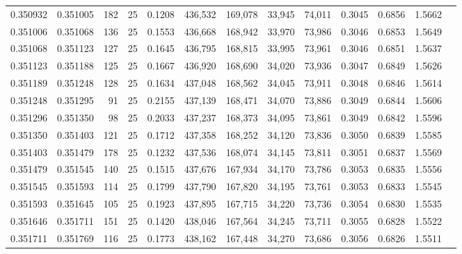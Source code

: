 \begin{tabular}{rrrrrrrrrrrrr}
0.350932 & 0.351005 &   182 &  25 &                                     0.1208 & 436,532 & 169,078 &  33,945 &  74,011 & 0.3045 & 0.6856 & 1.5662 \\
0.351006 & 0.351068 &   136 &  25 &                                     0.1553 & 436,668 & 168,942 &  33,970 &  73,986 & 0.3046 & 0.6853 & 1.5649 \\
0.351068 & 0.351123 &   127 &  25 &                                     0.1645 & 436,795 & 168,815 &  33,995 &  73,961 & 0.3046 & 0.6851 & 1.5637 \\
0.351123 & 0.351188 &   125 &  25 &                                     0.1667 & 436,920 & 168,690 &  34,020 &  73,936 & 0.3047 & 0.6849 & 1.5626 \\
0.351189 & 0.351248 &   128 &  25 &                                     0.1634 & 437,048 & 168,562 &  34,045 &  73,911 & 0.3048 & 0.6846 & 1.5614 \\
0.351248 & 0.351295 &    91 &  25 &                                     0.2155 & 437,139 & 168,471 &  34,070 &  73,886 & 0.3049 & 0.6844 & 1.5606 \\
0.351296 & 0.351350 &    98 &  25 &                                     0.2033 & 437,237 & 168,373 &  34,095 &  73,861 & 0.3049 & 0.6842 & 1.5596 \\
0.351350 & 0.351403 &   121 &  25 &                                     0.1712 & 437,358 & 168,252 &  34,120 &  73,836 & 0.3050 & 0.6839 & 1.5585 \\
0.351403 & 0.351479 &   178 &  25 &                                     0.1232 & 437,536 & 168,074 &  34,145 &  73,811 & 0.3051 & 0.6837 & 1.5569 \\
0.351479 & 0.351545 &   140 &  25 &                                     0.1515 & 437,676 & 167,934 &  34,170 &  73,786 & 0.3053 & 0.6835 & 1.5556 \\
0.351545 & 0.351593 &   114 &  25 &                                     0.1799 & 437,790 & 167,820 &  34,195 &  73,761 & 0.3053 & 0.6833 & 1.5545 \\
0.351593 & 0.351645 &   105 &  25 &                                     0.1923 & 437,895 & 167,715 &  34,220 &  73,736 & 0.3054 & 0.6830 & 1.5535 \\
0.351646 & 0.351711 &   151 &  25 &                                     0.1420 & 438,046 & 167,564 &  34,245 &  73,711 & 0.3055 & 0.6828 & 1.5522 \\
0.351711 & 0.351769 &   116 &  25 &                                     0.1773 & 438,162 & 167,448 &  34,270 &  73,686 & 0.3056 & 0.6826 & 1.5511 \\

\end{tabular}
